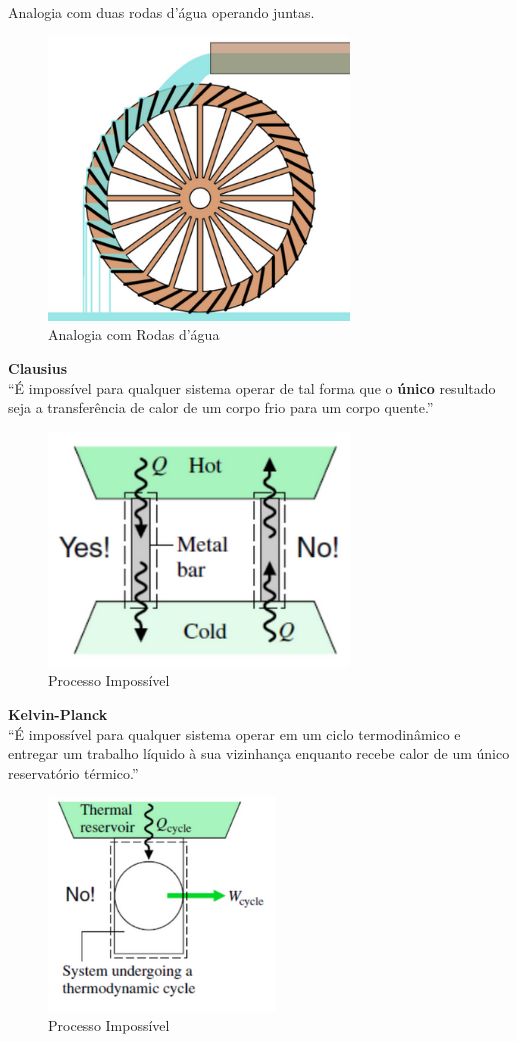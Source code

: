 \documentclass[a4paper, 12pt]{article}
\begin{document}
Analogia com duas rodas d’água
operando juntas.

	\begin{figure}[h]
		\includegraphics[width = 8cm]{cc.png}
		\centering
		\caption{Analogia com Rodas d'água}
	\end{figure}

\textbf{Clausius}\\
“É impossível para qualquer
sistema operar de tal forma que o
\textbf{único} resultado seja a transferência
de calor de um corpo frio para um
corpo quente.”

	\begin{figure}[h]
		\includegraphics[width = 8cm]{caca.png}
		\centering
		\caption{Processo Impossível}
	\end{figure}

\newpage
\textbf{Kelvin-Planck}\\
“É impossível para qualquer sistema
operar em um ciclo termodinâmico e
entregar um trabalho líquido à sua
vizinhança enquanto recebe calor de
um único reservatório térmico.”

	\begin{figure}[h]
		\includegraphics[width = 6cm]{kp.png}
		\centering
		\caption{Processo Impossível}
	\end{figure}
\end{document}
